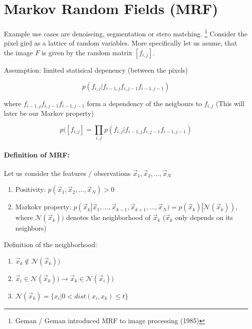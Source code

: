 
\section*{Markov Random Fields (MRF)}

Example use cases are denoiseing, segmentation or stero matching. \footnote{Geman / Geman introduced MRF to image processing (1985)} Consider the pixel gird as a lattice of random variables. More specifically let us asume, that the image $F$ is given by the random matrix $[f_{i,j}]$.

Assumption: limited statisical depenency (between the pixels)

\begin{equation*}
    p(f_{i, j} | f_{i-1, j} f_{i, j-1} f_{i-1, j-1})
\end{equation*}

where $f_{i-1, j} f_{i, j-1} f_{i-1, j-1}$ form a dependency of the neigbours to $f_{i,j}$ (This will later be our Markov property)

\begin{equation*}
    p([f_{i, j}] = \prod_{i,j} p(f_{i, j} | f_{i-1, j} f_{i, j-1} f_{i-1, j-1})
\end{equation*}

\paragraph{Definition of MRF:\\}

Let us consider the features / observations $\vec{x}_1, \vec{x}_2, \dots, \vec{x}_N$
\begin{enumerate}
    \item Positivity: $ p(\vec{x}_1, \vec{x}_2, \dots, \vec{x}_N) > 0$
    \item Markokv property: $ p(\vec{x}_k |\vec{x}_1, \dots, \vec{x}_{k-1}, \vec{x}_{k+1}, \dots, \vec{x}_N) = p(\vec{x}_k) | \mathcal{N}(\vec{x}_k)) $, where $\mathcal{N}(\vec{x}_k))$ denotes the neighborhood of $\vec{x}_k$ ($\vec{x}_k$ only depends on its neighbors)
\end{enumerate}

Definition of the neighborhood:
\begin{enumerate}
	\item $\vec{x}_k \notin \mathcal{N}(\vec{x}_k))$
	\item $\vec{x}_i \in \mathcal{N}(\vec{x}_k)) \rightarrow \vec{x}_k \in \mathcal{N}(\vec{x}_i))$
	\item $\mathcal{N}(\vec{x}_k) = \{x_i|0 < dist(x_i, x_k) \le t\}$
\end{enumerate}

